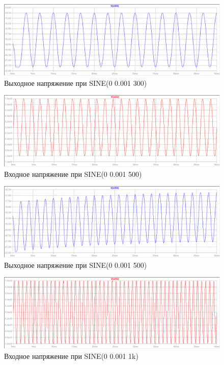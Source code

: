 \documentclass[a4paper, 12pt]{article}
\begin{document}
    \begin{figure}[H]
        \centering
        \includegraphics[scale=0.46]{3task_sine_out_1mV_300f.png}
        \captionsetup{skip=0pt}
        \caption{Выходное напряжение при SINE(0 0.001 300)}
        \label{fig:3task_sine_in_1mV_300f}
    \end{figure}
    \begin{figure}[H]
        \centering
        \includegraphics[scale=0.46]{3task_sine_in_1mV_500f.png}
        \captionsetup{skip=0pt}
        \caption{Входное напряжение при SINE(0 0.001 500)}
        \label{fig:3task_sine_in_1mV_500f}
    \end{figure}
    \begin{figure}[H]
        \centering
        \includegraphics[scale=0.46]{3task_sine_out_1mV_500f.png}
        \captionsetup{skip=0pt}
        \caption{Выходное напряжение при SINE(0 0.001 500)}
        \label{fig:3task_sine_in_1mV_500f}
    \end{figure}
    \begin{figure}[H]
        \centering
        \includegraphics[scale=0.46]{3task_sine_in_1mV_1kf.png}
        \captionsetup{skip=0pt}
        \caption{Входное напряжение при SINE(0 0.001 1k)}
        \label{fig:3task_sine_in_1mV_1kf}
    \end{figure}
\end{document}
